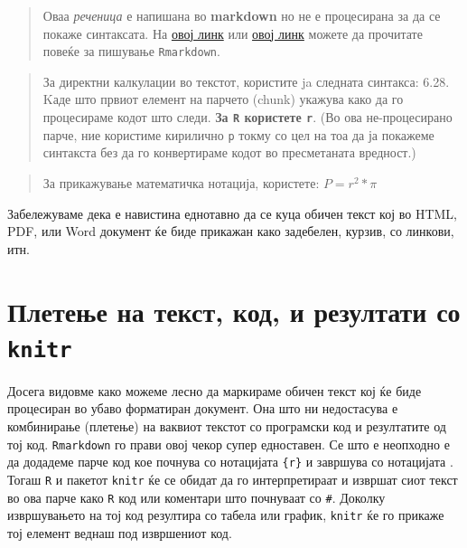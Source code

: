 \documentclass[
]{book}
\begin{document}
\begin{quote}
Оваа \emph{реченица} е напишана во \textbf{markdown} но не е процесирана за да се покаже синтаксата.
На \href{https://kbroman.org/knitr_knutshell/pages/Rmarkdown.html}{овој линк} или
\href{https://rmarkdown.rstudio.com/authoring_quick_tour.html}{овој линк} можете да
прочитате повеќе за пишување \texttt{Rmarkdown}.
\end{quote}

\begin{quote}
За директни калкулации во текстот, користите ja следната синтакса: 6.28.
Kаде што првиот елемент на парчето (chunk) укажува како да го процесираме кодот што следи.
\textbf{За \texttt{R} користете \texttt{r}}. (Во ова не-процесирано парче, ние користиме кирилично \texttt{р} токму со
цел на тоа да ја покажеме синтакста без да го конвертираме кодот во пресметаната вредност.)
\end{quote}

\begin{quote}
За прикажување математичка нотација, користете: \(P = r^2 * \pi\)
\end{quote}

Забележуваме дека е навистина еднотавно да се куца обичен текст кој во HTML, PDF, или Word документ ќе биде прикажан како задебелен, курзив, со линкови, итн.

\hypertarget{ux43fux43bux435ux442ux435ux45aux435-ux43dux430-ux442ux435ux43aux441ux442-ux43aux43eux434-ux438-ux440ux435ux437ux443ux43bux442ux430ux442ux438-ux441ux43e-knitr}{%
\section{\texorpdfstring{Плетење на текст, код, и резултати со \texttt{knitr}}{Плетење на текст, код, и резултати со knitr}}\label{ux43fux43bux435ux442ux435ux45aux435-ux43dux430-ux442ux435ux43aux441ux442-ux43aux43eux434-ux438-ux440ux435ux437ux443ux43bux442ux430ux442ux438-ux441ux43e-knitr}}

Досега видовме како можеме лесно да маркираме обичен текст кој ќе биде процесиран во убаво форматиран документ. Она што ни недостасува е комбинирање (плетење) на ваквиот текстот со програмски код и резултатите од тој код. \texttt{Rmarkdown} го прави овој чекор супер едноставен. Се што е неопходно е да додадеме парче код кое почнува со нотацијата \texttt{\textasciigrave{}\textasciigrave{}\textasciigrave{}\{r\}} и завршува со нотацијата \texttt{\textasciigrave{}\textasciigrave{}\textasciigrave{}}. Тогаш \texttt{R} и пакетот \texttt{knitr} ќе се обидат да го интерпретираат и извршат сиот текст во ова парче како \texttt{R} код или коментари што почнуваат со \texttt{\#}. Доколку извршувањето на тој код резултира со табела или график, \texttt{knitr} ќе го прикаже тој елемент веднаш под извршениот код.
\end{document}
